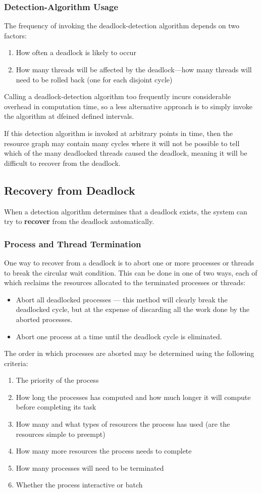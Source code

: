 \documentclass{article}
\begin{document}
\subsubsection{Detection-Algorithm Usage}
The frequency of invoking the deadlock-detection algorithm depends on
two factors:
\begin{enumerate}
    \item How often a deadlock is likely to occur
    \item How many threads will be affected by the deadlock---how many
          threads will need to be rolled back (one for each disjoint
          cycle)
\end{enumerate}
Calling a deadlock-detection algorithm too frequently incurs
considerable overhead in computation time, so a less alternative approach
is to simply invoke the algorithm at dfeined defined intervals.

If this detection algorithm is invoked at arbitrary points in time,
then the resource graph may contain many cycles where it will not be
possible to tell which of the many deadlocked threads caused the
deadlock, meaning it will be difficult to recover from the deadlock.
\subsection{Recovery from Deadlock}
When a detection algorithm determines that a deadlock exists, the
system can try to \textbf{recover} from the deadlock automatically.
\subsubsection{Process and Thread Termination}
One way to recover from a deadlock is to abort one or more processes or
threads to break the circular wait condition. This can be done in one
of two ways, each of which reclaims the resources allocated to the
terminated processes or threads:
\begin{itemize}
    \item Abort all deadlocked processes --- this method will clearly
          break the deadlocked cycle, but at the expense of discarding
          all the work done by the aborted processes.
    \item Abort one process at a time until the deadlock cycle is
          eliminated.
\end{itemize}
The order in which processes are aborted may be determined using the following criteria:
\begin{enumerate}
    \item The priority of the process
    \item How long the processes has computed and how much longer it
          will compute before completing its task
    \item How many and what types of resources the process has used
          (are the resources simple to preempt)
    \item How many more resources the process needs to complete
    \item How many processes will need to be terminated
    \item Whether the process interactive or batch
\end{enumerate}
\end{document}
